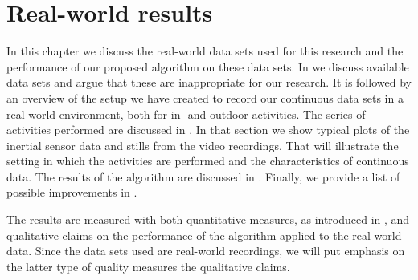 
\chapter{Real-world results}

\label{Chapter6} %


In this chapter we discuss the real-world data sets used for this research and the performance of our proposed algorithm on these data sets.
In  we discuss available data sets and argue that these are inappropriate for our research.
It is followed by an overview of the setup we have created to record our continuous data sets in a real-world environment, both for in- and outdoor activities.
The series of activities performed are discussed in .
In that section we show typical plots of the inertial sensor data and stills from the video recordings.
That will illustrate the setting in which the activities are performed and the characteristics of continuous data.
The results of the algorithm are discussed in .
Finally, we provide a list of possible improvements in .

The results are measured with both quantitative measures, as introduced in , and qualitative claims on the performance of the algorithm applied to the real-world data.
Since the data sets used are real-world recordings, we will put emphasis on the latter type of quality measures \ie the qualitative claims.



